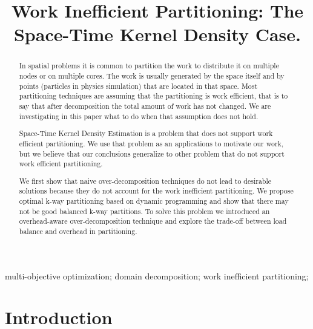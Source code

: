 \documentclass[10pt, conference, compsocconf]{IEEEtran}
\begin{document}
\title{Work Inefficient Partitioning: The Space-Time Kernel Density Case.}


\author{
}

\maketitle


\begin{abstract}
  In spatial problems it is common to partition the work to distribute
  it on multiple nodes or on multiple cores. The work is usually
  generated by the space itself and by points (particles in physics
  simulation) that are located in that space. Most partitioning
  techniques are assuming that the partitioning is work efficient,
  that is to say that after decomposition the total amount of work has
  not changed. We are investigating in this paper what to do when that
  assumption does not hold.

  Space-Time Kernel Density Estimation is a problem that does not
  support work efficient partitioning. We use that problem as an
  applications to motivate our work, but we believe that our
  conclusions generalize to other problem that do not support work
  efficient partitioning.

  We first show that naive over-decomposition techniques do not lead
  to desirable solutions because they do not account for the work
  inefficient partitioning. We propose optimal k-way partitioning
  based on dynamic programming and show that there may not be good
  balanced k-way partitions. To solve this problem we introduced an
  overhead-aware over-decomposition technique and explore the
  trade-off between load balance and overhead in partitioning.
\end{abstract}

\begin{IEEEkeywords}
multi-objective optimization; domain decomposition; work inefficient partitioning;
\end{IEEEkeywords}


\IEEEpeerreviewmaketitle

\section{Introduction}
\end{document}
